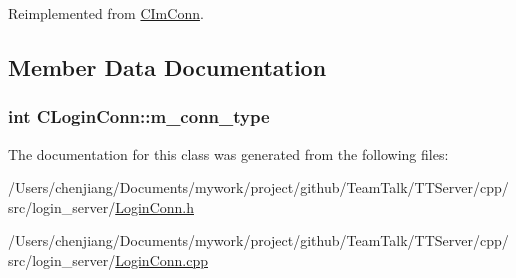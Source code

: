 Reimplemented from \hyperlink{class_c_im_conn_adc9be86c438a9884b3bf51fd5da180bc}{C\+Im\+Conn}.



\subsection{Member Data Documentation}
\hypertarget{class_c_login_conn_a324b67d65eeb825e5e0a333a6329ff91}{}
\subsubsection[{m\+\_\+conn\+\_\+type}]{\setlength{\rightskip}{0pt plus 5cm}int C\+Login\+Conn\+::m\+\_\+conn\+\_\+type\hspace{0.3cm}{\ttfamily [private]}}\label{class_c_login_conn_a324b67d65eeb825e5e0a333a6329ff91}


The documentation for this class was generated from the following files\+:\begin{DoxyCompactItemize}
\item 
/\+Users/chenjiang/\+Documents/mywork/project/github/\+Team\+Talk/\+T\+T\+Server/cpp/src/login\+\_\+server/\hyperlink{_login_conn_8h}{Login\+Conn.\+h}\item 
/\+Users/chenjiang/\+Documents/mywork/project/github/\+Team\+Talk/\+T\+T\+Server/cpp/src/login\+\_\+server/\hyperlink{_login_conn_8cpp}{Login\+Conn.\+cpp}\end{DoxyCompactItemize}
